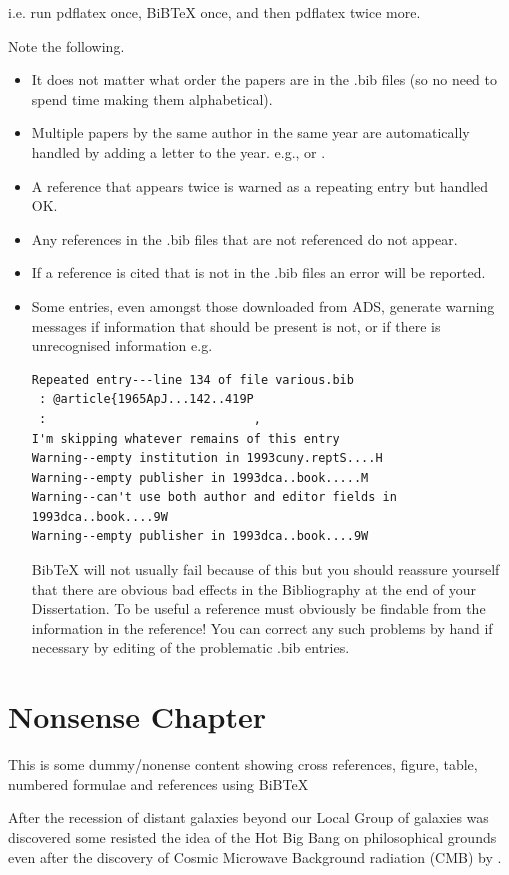 \documentclass[twoside,fontsize=12pt,
     bibliography=totoc, %
     listof=totoc, %
     index=totoc, %
     onehalfspacing %
]{_MScDiss2017_cls}
\begin{document}
i.e. run pdflatex once, BiBTeX once, and then pdflatex twice more.

Note the following.
\begin{itemize}{}\item It does not matter what order the papers are in the .bib files (so no need to spend time making them alphabetical).
\item Multiple papers by the same author in the same year are automatically handled  by adding a letter to the year. e.g.,  or . 
\item A reference that appears twice is warned as a repeating entry but handled OK. 
\item Any references in the .bib files that are not referenced do not appear.
\item If a reference is cited that is not in the .bib files an error will be reported. 
\item Some entries, even amongst those downloaded from ADS,  generate warning messages if information that should be present  is not, or if there is unrecognised information  e.g.
\begin{verbatim}
Repeated entry---line 134 of file various.bib
 : @article{1965ApJ...142..419P
 :                             ,
I'm skipping whatever remains of this entry
Warning--empty institution in 1993cuny.reptS....H
Warning--empty publisher in 1993dca..book.....M
Warning--can't use both author and editor fields in 1993dca..book....9W
Warning--empty publisher in 1993dca..book....9W
\end{verbatim}
BibTeX will not usually fail because of this but you should reassure yourself that there are obvious bad effects in the Bibliography at the end of your Dissertation. To be useful a reference must obviously be findable from the information in the reference! You can correct any such problems by hand if necessary by editing of the problematic .bib entries.
\end{itemize}

\chapter{Nonsense Chapter }
\label{ch:eqm}
This is some dummy/nonense content showing cross references, figure, table, numbered formulae and references using BiBTeX

After the recession of distant galaxies beyond our Local Group of galaxies  was discovered   some  resisted the idea of the Hot Big Bang on philosophical grounds even after the discovery of Cosmic Microwave Background radiation (CMB) by . 
\end{document}
